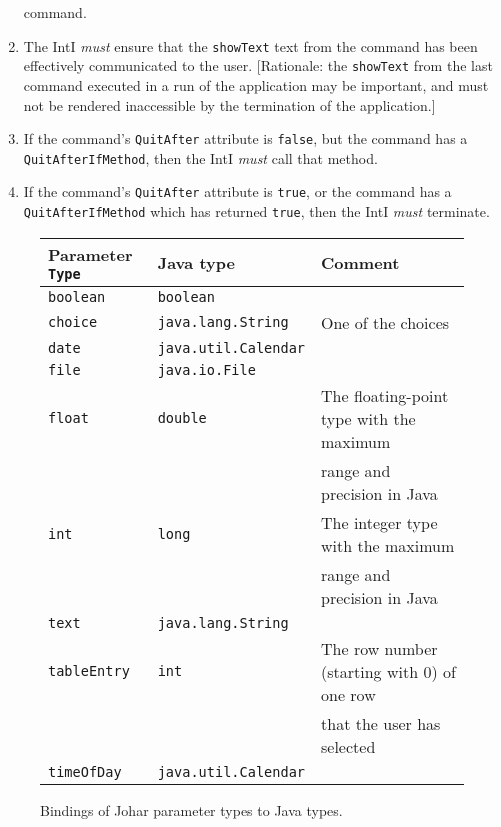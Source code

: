 \documentclass[11pt]{article}
\newcommand{\must}{{\it must}}
\newcounter{coreReq}
\begin{document}
\begin{enumerate}
  command.
\item The IntI {\must} ensure that the {\tt showText} text
  from the command has been effectively communicated to the user. 
  [Rationale: the {\tt showText} from the last command executed in a run
  of the application may be important, and must not be rendered
  inaccessible by the termination of the application.]
\item If the command's {\tt QuitAfter} attribute is
  {\tt false}, but the command has a {\tt QuitAfterIfMethod}, then the
  IntI {\must} call that method.
\item If the command's {\tt QuitAfter} attribute is
  {\tt true}, or the command has a {\tt QuitAfterIfMethod} which has
  returned {\tt true}, then the IntI {\must} terminate.
\setcounter{coreReq}{\value{enumi}}
\end{enumerate}

\begin{figure}

\begin{center}
\begin{tabular}{|l|l|l|}
Parameter {\tt Type}	& Java type
	& Comment \\
\hline
{\tt boolean}		& {\tt boolean}
	& \\
\hline
{\tt choice}		& {\tt java.lang.String}
	& One of the choices \\
\hline
{\tt date}		& {\tt java.util.Calendar}
	& \\
\hline
{\tt file}		& {\tt java.io.File}
	& \\
\hline
{\tt float}		& {\tt double}
	& The floating-point type with the maximum \\
 &	& range and precision in Java \\
\hline
{\tt int}		& {\tt long}
	& The integer type with the maximum \\
 &	& range and precision in Java \\
\hline
{\tt text}		& {\tt java.lang.String}
	& \\
\hline
{\tt tableEntry}	& {\tt int}
	& The row number (starting with 0) of one row \\
 &	& that the user has selected \\
\hline
{\tt timeOfDay}		& {\tt java.util.Calendar}
	& \\
\hline
\end{tabular}
\end{center}

\caption{Bindings of Johar parameter types to Java types.}
\label{java-type-binding-figure}
\end{figure}
\end{document}
